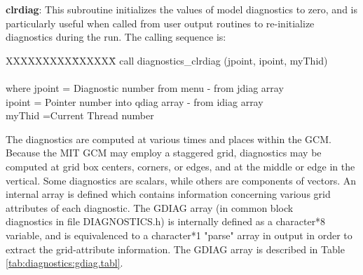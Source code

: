 \noindent
{\bf clrdiag}:  This subroutine initializes the values of model diagnostics to zero, and is
particularly useful when called from user output routines to re-initialize diagnostics 
during the run.  The calling sequence is:

\noindent
\begin{tabbing}
XXXXXXXXX\=XXXXXX\= \kill
\>        call diagnostics\_clrdiag (jpoint, ipoint, myThid) \\
\\
where \>  jpoint \>= Diagnostic number from menu - from jdiag array \\
          ipoint \>= Pointer number into qdiag array - from idiag array \\
      \>  myThid \>=Current Thread number \\
\end{tabbing}

\noindent
The diagnostics are computed at various times and places within the GCM. Because the
MIT GCM may employ a staggered grid, diagnostics may be computed at grid box centers,
corners, or edges, and at the middle or edge in the vertical. Some diagnostics are scalars, 
while others are components of vectors. An internal array is defined which contains 
information concerning various grid attributes of each diagnostic. The GDIAG
array (in common block \\diagnostics in file DIAGNOSTICS.h) is internally defined as a 
character*8 variable, and is equivalenced to a character*1 "parse" array in output in 
order to extract the grid-attribute information.  The GDIAG array is described in 
Table \ref{tab:diagnostics:gdiag.tabl}.

